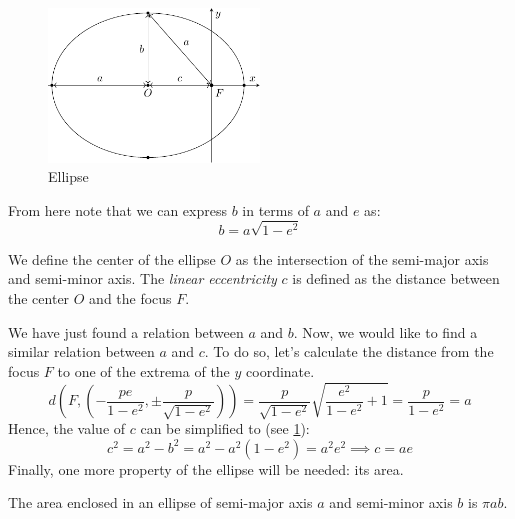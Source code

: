 \documentclass[../main.tex]{subfiles}
\begin{document}
\begin{figure}[htbp]
  \centering
  \includegraphics[width=0.5\textwidth]{Images/ellipse.pdf}
  \caption{Ellipse}
  \label{fig:ellipse}
\end{figure}

From here note that we can express $b$ in terms of $a$ and $e$ as:
\begin{equation}\label{eq:ellipse_b_a}
  b=a\sqrt{1-e^2}
\end{equation}
\begin{definition}
  We define the center of the ellipse $O$ as the intersection of the semi-major axis and semi-minor axis. The \emph{linear eccentricity} $c$ is defined as the distance between the center $O$ and the focus $F$.
\end{definition}
We have just found a relation between $a$ and $b$. Now, we would like to find a similar relation between $a$ and $c$. To do so, let's calculate the distance from the focus $F$ to one of the extrema of the $y$ coordinate.
\begin{equation}
  d\left(F,\left(-\frac{pe}{1-e^2},\pm \frac{p}{\sqrt{1-e^2}}\right)\right)=\frac{p}{\sqrt{1-e^2}}\sqrt{\frac{e^2}{1-e^2}+1}=\frac{p}{1-e^2}=a
\end{equation}
Hence, the value of $c$ can be simplified to (see \cref{fig:ellipse}):
\begin{equation}
  c^2=a^2-b^2=a^2-a^2(1-e^2)=a^2e^2\implies c=ae
\end{equation}
Finally, one more property of the ellipse will be needed: its area.
\begin{proposition}
  The area enclosed in an ellipse of semi-major axis $a$ and semi-minor axis $b$ is $\pi a b$.
\end{proposition}
\end{document}
